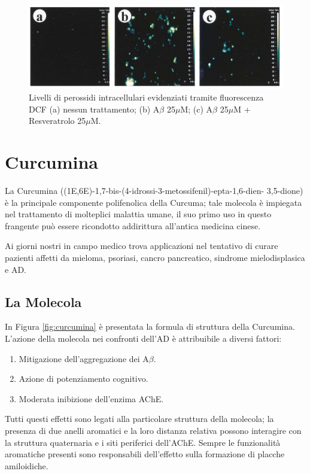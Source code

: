 \documentclass[a4paper, 12pt]{article}
\begin{document}
\begin{figure}[H]
	\centering
	\includegraphics[width=.9\linewidth]{immagini/roi_resveratrolo.png}
	\caption{Livelli di perossidi intracellulari evidenziati tramite fluorescenza DCF (a) nessun trattamento; (b) A\(\beta\) 25$\mu$M; (c) A\(\beta\) 25$\mu$M + Resveratrolo 25$\mu$M.}
	\label{fig:roi_resveratrolo}
\end{figure}

\section{Curcumina}
\label{sec:curc}
La Curcumina ((1E,6E)-1,7-bis-(4-idrossi-3-metossifenil)-epta-1,6-dien- 3,5-dione) è la principale componente polifenolica della Curcuma; tale molecola è impiegata nel trattamento di molteplici malattia umane, il suo primo uso in questo frangente può essere ricondotto addirittura all'antica medicina cinese.

Ai giorni nostri in campo medico trova applicazioni nel tentativo di curare pazienti affetti da mieloma, psoriasi, cancro pancreatico, sindrome mielodisplasica e AD.

\subsection{La Molecola}
In Figura \ref{fig:curcumina} è presentata la formula di struttura della Curcumina. L'azione della molecola nei confronti dell'AD è attribuibile a diversi fattori:

\begin{enumerate}
	\item Mitigazione dell'aggregazione dei A\(\beta\).
	\item Azione di potenziamento cognitivo.
	\item Moderata inibizione dell'enzima AChE.
\end{enumerate}

Tutti questi effetti sono legati alla particolare struttura della molecola; la presenza di due anelli aromatici e la loro distanza relativa possono interagire con la struttura quaternaria  e i siti periferici dell'AChE. Sempre le funzionalità aromatiche presenti sono responsabili dell'effetto sulla formazione di placche amiloidiche.
\end{document}
